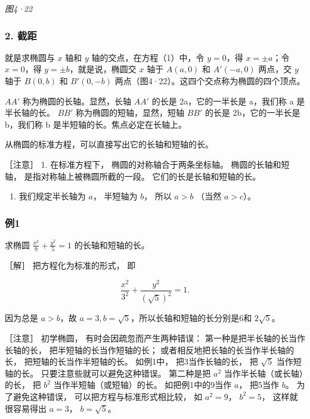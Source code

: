 \emph{图4·22}

\subsubsection{2. 截距}\label{ux622aux8ddd-1}

就是求椭圆与 \(x\) 轴和 \(y\) 轴的交点，在方程（1）中，令 \(y = 0\)，得
\(x = \pm a\)；令 \(x = 0\)，得 \(y = \pm b\)，就是说，椭圆交 \(x\) 轴于
\(A(a,0)\) 和 \(A'(-a,0)\) 两点，交 \(y\) 轴于 \(B(0,b)\) 和
\(B'(0,-b)\) 两点（图4·22）。这四个交点称为椭圆的四个顶点。

\(AA'\) 称为椭圆的长轴。显然，长轴 \(AA'\) 的长是 2a，它的一半长是
a，我们称 a 是半长轴的长。 \(BB'\) 称为椭圆的短轴，显然，短轴 \(BB'\)
的长是 2b，它的一半长是 b，我们称 b 是半短轴的长。焦点必定在长轴上。

从椭圆的标准方程，可以直接写出它的长轴和短轴的长。

［注意］ 1. 在标准方程下， 椭圆的对称轴合于两条坐标轴。
椭圆的长轴和短轴， 是指对称轴上被椭圆所截的一段。
它们的长是长轴和短轴的长。

\begin{enumerate}
\def\labelenumi{\arabic{enumi}.}
\setcounter{enumi}{1}
\tightlist
\item
  我们规定半长轴为 \(a\)， 半短轴为 \(b\)， 所以 \(a > b\) （当然
  \(a > c\)）。
\end{enumerate}

\subsubsection{例1}\label{ux4f8b1-25}

求椭圆 \(\frac{x^2}{9} +\frac{y^2}{5} = 1\) 的长轴和短轴的长。

［解］ 把方程化为标准的形式， 即

\[
\frac {x^{2}}{3^{2}} + \frac {y^{2}}{(\sqrt {5}) ^ {2}} = 1.
\]

因为总是 \(a > b\)，故
\(a = 3, b = \sqrt{5}\)，所以长轴和短轴的长分别是6和 \(2\sqrt{5}\)。

［注意］ 初学椭圆， 有时会因疏忽而产生两种错误：
第一种是把半长轴的长当作长轴的长， 把半短轴的长当作短轴的长；
或者相反地把长轴的长当作半长轴的长， 把短轴的长当作半短轴的长。
如例1中， 把3当作长轴的长， 把 \(\sqrt{5}\) 当作短轴的长。
只要注意些就可以避免这种错误。 第二种是把 \(a^2\)
当作半长轴（或长轴）的长， 把 \(b^2\) 当作半短轴（或短轴）的长。
如把例1中的9当作 \(a\)， 把5当作 \(b\)。 为了避免这种错误，
可以把方程与标准形式相比较， 如 \(a^2 = 9\)， \(b^2 = 5\)，
这样就很容易得出 \(a = 3\)， \(b = \sqrt{5}\)。

